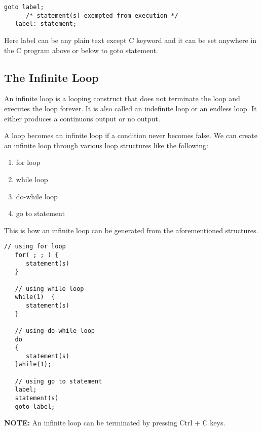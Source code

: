 \begin{lstlisting}[style=CStyle]
   goto label;
      /* statement(s) exempted from execution */
   label: statement;
\end{lstlisting}

Here label can be any plain text except C keyword and it can be set anywhere in the C program above or below to goto statement.

\subsection{The Infinite Loop}
An infinite loop is a looping construct that does not terminate the loop and executes the loop forever. It is also called an indefinite loop or an endless loop. It either produces a continuous output or no output.

\par A loop becomes an infinite loop if a condition never becomes false. We can create an infinite loop through various loop structures like the following:

\begin{enumerate}
   \item for loop
   \item while loop
   \item do-while loop
   \item go to statement
\end{enumerate}

This is how an infinite loop can be generated from the aforementioned structures.

\begin{lstlisting}[style=CStyle]
   // using for loop
   for( ; ; ) {
      statement(s)
   }

   // using while loop
   while(1)  {  
      statement(s)
   }  

   // using do-while loop
   do  
   {  
      statement(s)
   }while(1); 
   
   // using go to statement
   label;  
   statement(s)
   goto label;  
\end{lstlisting}

\textbf{NOTE:} An infinite loop can be terminated by pressing Ctrl + C keys.
